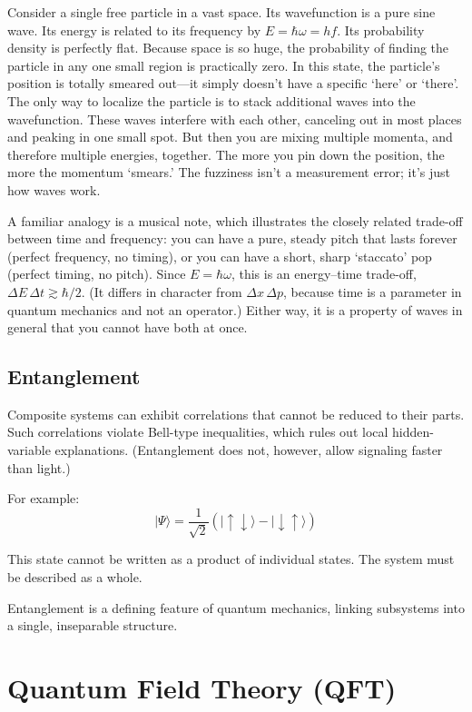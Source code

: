 Consider a single free particle in a vast space. Its wavefunction is a pure sine wave. Its energy is related to its frequency by $E=\hbar\omega = hf$. Its probability density is perfectly flat. 
Because space is so huge, the probability of finding the particle in any one small region is practically zero. In this state, the particle's position is totally smeared out---it simply doesn't 
have a specific `here' or `there'. 
The only way to localize the particle is to stack additional waves into the wavefunction. 
These waves interfere with each other, canceling out in most places and peaking in one small spot. 
But then you are mixing multiple momenta, and therefore multiple energies, together. The more you pin down the position, the more the momentum `smears.' The fuzziness isn't a measurement error; it's just how waves work.

A familiar analogy is a musical note, which illustrates the closely related trade-off between time and frequency: you can have a pure, steady pitch that lasts forever (perfect frequency, no timing), or you can have a short, sharp `staccato' pop (perfect timing, no pitch). Since $E=\hbar\omega$, this is an energy--time trade-off, $\Delta E\,\Delta t \gtrsim \hbar/2$. (It differs in character from $\Delta x\,\Delta p$, because time is a parameter in quantum mechanics and not an operator.)
Either way, it is a property of waves in general that you cannot have both at once.


\subsection*{Entanglement}

Composite systems can exhibit correlations that cannot be reduced to their parts.
Such correlations violate Bell-type inequalities, which rules out local hidden-variable explanations. 
(Entanglement does not, however, allow signaling faster than light.)

For example:
\[
|\Psi\rangle = \frac{1}{\sqrt{2}}
\left(
| \uparrow \downarrow \rangle - | \downarrow \uparrow \rangle
\right)
\]

This state cannot be written as a product of individual states. The system must be described as a whole.

Entanglement is a defining feature of quantum mechanics, linking subsystems into a single, inseparable structure.


\section*{Quantum Field Theory (QFT)}

